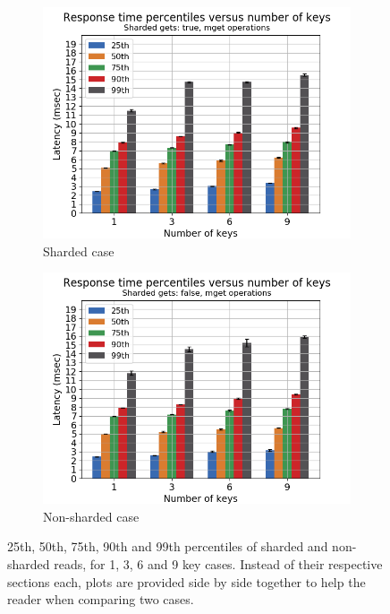 \documentclass[11pt,a4paper]{article}
\begin{document}
\begin{figure}[h!]
\begin{subfigure}{.5\textwidth}
  \centering
  \includegraphics[width=1.0\linewidth ,trim={5px 0px 20px 0px},clip]{img/plot/gmg-perc-mget-true.png}
  \caption{Sharded case}
  \label{fig:gmg-perc-true}
\end{subfigure}%
\begin{subfigure}{.5\textwidth}
  \centering
  \includegraphics[width=1.0\linewidth ,trim={5px 0px 20px 0px},clip]{img/plot/gmg-perc-mget-false.png}
  \caption{Non-sharded case}
  \label{fig:gmg-perc-false}
\end{subfigure}
\caption{25th, 50th, 75th, 90th and 99th percentiles of sharded and non-sharded reads, for 1, 3, 6 and 9 key cases. Instead of their respective sections each, plots are provided side by side together to help the reader when comparing two cases.}
\label{fig:gmg-perc}
\end{figure}
\end{document}
